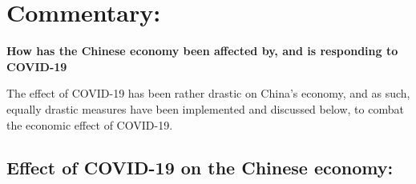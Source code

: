 \documentclass[11pt, a4paper]{article}
\begin{document}
    \section{Commentary:}
        \begin{center}
            \textbf{\Large How has the Chinese economy been affected by, and is responding to COVID-19}
        \end{center}
        The effect of COVID-19 has been rather drastic on China's economy, and as such, equally drastic measures have been implemented and discussed below, to combat the economic effect of COVID-19.

        \subsection{Effect of COVID-19 on the Chinese economy:}
                        
\end{document}
